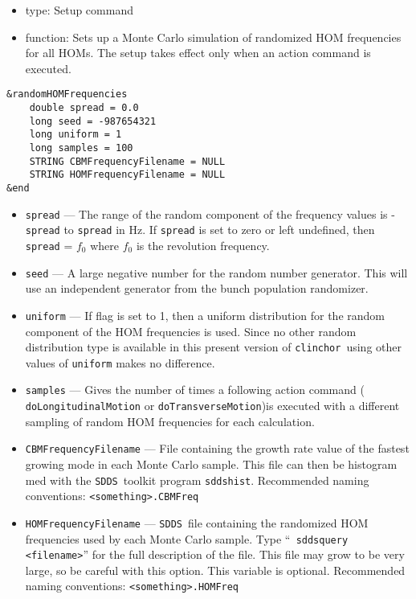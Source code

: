\documentclass[11pt]{article}
\newcommand{\clinchor}{{\tt clinchor}}
\newcommand{\SDDS}{{\tt SDDS}}
\newcommand{\sddshist}{{\tt sddshist}}
\begin{document}
\begin{itemize}
\item type: Setup command
\item function: Sets up a Monte Carlo simulation of randomized HOM
frequencies for all HOMs. The setup takes effect only when an action
command is executed.
\end{itemize}
\begin{verbatim}
&randomHOMFrequencies
    double spread = 0.0
    long seed = -987654321
    long uniform = 1
    long samples = 100
    STRING CBMFrequencyFilename = NULL
    STRING HOMFrequencyFilename = NULL
&end
\end{verbatim}
\begin{itemize}
\item {\tt spread} --- The range of the random component of the
frequency values is -{\tt spread} to {\tt spread} in Hz.  If {\tt spread} is set
to zero or left undefined, then {\tt spread} = $f_0$ where $f_0$ is the
revolution frequency.
\item {\tt seed} --- A large negative number for the random number generator. This will use an independent generator from the bunch population randomizer.
\item {\tt uniform} --- If flag is set to 1, then a uniform
distribution for the random component of the HOM frequencies is used.
Since no other random distribution type is available in this present
version of \clinchor\, using other values of {\tt uniform} makes no
difference.
\item {\tt samples} --- Gives the number of times a following action
command ( {\tt doLongitudinalMotion} or {\tt doTransverseMotion})is
executed with a different sampling of random HOM frequencies for each
calculation.
\item {\tt CBMFrequencyFilename} --- File containing the growth rate value of the
fastest growing mode in each Monte Carlo sample.  This file can then
be histogram med with the \SDDS\ toolkit program \sddshist. Recommended
naming conventions: {\tt <something>.CBMFreq}

\item {\tt HOMFrequencyFilename} --- \SDDS\ file containing the
randomized HOM frequencies used by each Monte Carlo sample. Type ``{\tt
sddsquery <filename>}'' for the full description of the file.  This
file may grow to be very large, so be careful with this option. This
variable is optional. Recommended naming conventions: {\tt <something>.HOMFreq}
\end{itemize}
\end{document}
